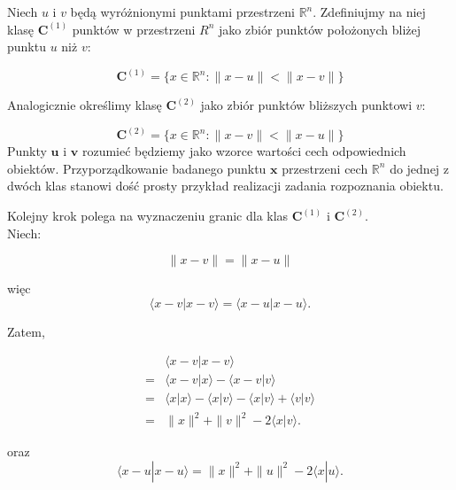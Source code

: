 Niech $u$ i $v$ będą wyróżnionymi punktami przestrzeni $\mathbb{R}^{n}$. Zdefiniujmy na niej klasę $\bm{C}^{(1)}$ punktów w przestrzeni $R^{n}$ jako zbiór punktów położonych bliżej punktu $u$ niż $v$:

\begin{equation}
    \bm{C}^{(1)} = \bigg\{ x \in \mathbb{R}^{n} : \| x - u\| < \| x - v\| \bigg\} 
\end{equation}

Analogicznie określimy klasę $\bm{C}^{(2)}$ jako zbiór punktów bliższych punktowi $v$:

\begin{equation}
    \bm{C}^{(2)} = \bigg\{ x \in \mathbb{R}^{n} : \|x - v\| < \| x - u\| \bigg\}
\end{equation}
Punkty $\bm{u}$ i $\bm{v}$ rozumieć będziemy jako wzorce wartości cech odpowiednich obiektów. Przyporządkowanie badanego punktu $\bm{x}$ przestrzeni cech $\mathbb{R}^{n}$ do jednej z dwóch klas stanowi dość prosty przykład realizacji zadania rozpoznania obiektu.

Kolejny krok polega na wyznaczeniu granic dla klas $\bm{C}^{(1)}$ i $\bm{C}^{(2)}$. 
\\
Niech:

\begin{equation}
\|{x - v}\| = \|{x- u}\|
\end{equation}

więc
\begin{equation}
    \big \langle x - v | x - v \big \rangle = \big \langle x - u | x - u \big \rangle.
\end{equation}

Zatem,

\begin{align}
    & \big \langle x - v | x - v \big \rangle \\  = &  
    \big \langle x - v |x \big \rangle - \big \langle x - v | v \big \rangle \\ =   
    & \big \langle x | x \big \rangle - \big \langle x | v \big \rangle - \big \langle x | v \big \rangle + \big \langle v | v \big \rangle \\ = &
      \|x\|^{2} + \|v\|^{2} - 2 \big \langle x | v \big \rangle. 
\end{align}

oraz
\begin{equation*}
    \big \langle x - u | x - u \big \rangle = \|x\|^{2} + \|u\|^{2} - 2 \big \langle x | u \big \rangle.
\end{equation*}

